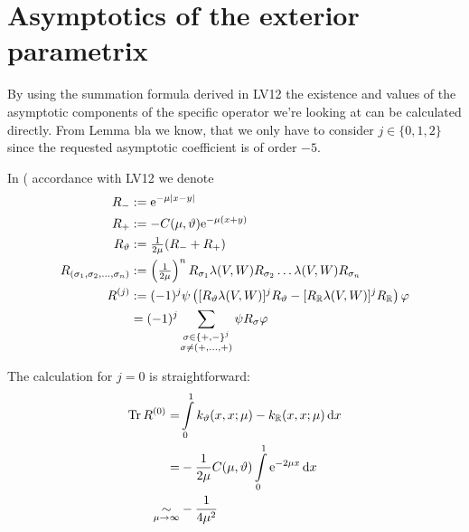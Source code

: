 \section{Asymptotics of the exterior parametrix}
By using the summation formula derived in LV12 the existence and values of the
asymptotic components of the specific operator we're looking at can be
calculated directly. From Lemma bla we know, that we only have to consider $j\in
\{0, 1, 2\}$ since the requested asymptotic coefficient is of order $-5$.

In (%
accordance with LV12 we denote
\begin{align*}
    R_- &:= \Eto{-\mu\left|x-y\right|} \\
    R_+ &:= -C(\mu,\theta)\Eto{-\mu(x+y)} \\
    R_\theta &:= \tfrac1{2\mu} (R_- + R_+) \\
    R_{(\sigma_1,\sigma_2,\ldots,\sigma_n)} &:= 
    \left(\tfrac1{2\mu}\right)^n R_{\sigma_1} \lambda(V,W) R_{\sigma_2} \dots
    \lambda(V,W) R_{\sigma_n} \\
    R^{(j)} &:= (-1)^j \psi \left( [R_\theta \lambda(V,W)]^j R_\theta -
    [R_\mathbb{R}\lambda(V,W)]^j R_\mathbb{R}\right) \phi \\
            &= (-1)^j
                \sum_{
                        \substack{
                         \sigma\in\{+,-\}^j \\
                         \sigma\neq(+,\ldots,+)
                         }
                        }
                     \psi R_\sigma
                \phi
    \label{<++>}
\end{align*}


The calculation for $j=0$ is straightforward:
\begin{align}
    \Tr R^{(0)} =& \Integ[1]{0}{x}{k_\theta(x,x;\mu) - k_\mathbb{R}(x,x;\mu)} \\
    =& -\frac1{2\mu} C(\mu,\theta) \Integ[1]{0}{x}{\Eto{-2\mu x}} \\
    \SimAs{\mu\to\infty}& -\frac1{4\mu^2}
    \label{eqn:jeq0}
\end{align}

